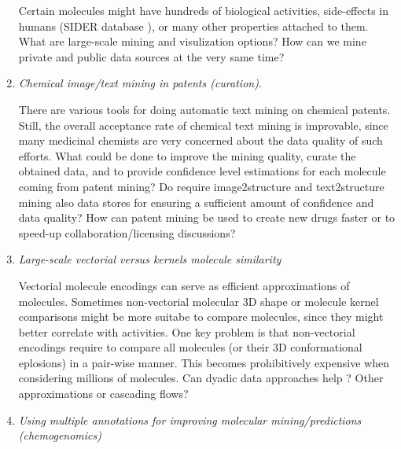 \documentclass{sig-alternate}
\begin{document}
\begin{enumerate}
  Certain molecules might have hundreds of biological activities,
  side-effects in humans (SIDER database
  \cite{Kuhn_Campillos_Letunic_Jensen_Bork_2010}), or many other
  properties attached to them. What are large-scale mining and
  visulization options?  How can we mine private and public data
  sources at the very same time?
%
\item \emph{Chemical image/text mining in patents (curation)}.

  There are various tools for doing automatic text mining on chemical
  patents. Still, the overall acceptance rate of chemical text mining
  is improvable, since many medicinal chemists are very concerned
  about the data quality of such efforts.  What could be done to
  improve the mining quality, curate the obtained data, and to provide
  confidence level estimations for each molecule coming from patent
  mining? Do require image2structure and text2structure mining also
  data stores for ensuring a sufficient amount of confidence and data
  quality?  How can patent mining be used to create new drugs faster
  or to speed-up collaboration/licensing discussions?

\item \emph{Large-scale vectorial versus kernels molecule similarity}

  Vectorial molecule encodings can serve as efficient approximations
  of molecules.  Sometimes non-vectorial molecular 3D shape or
  molecule kernel comparisons might be more suitabe to compare
  molecules, since they might better correlate with activities. One
  key problem is that non-vectorial encodings require to compare all
  molecules (or their 3D conformational eplosions) in a pair-wise
  manner.  This becomes prohibitively expensive when considering
  millions of molecules.  Can dyadic data approaches help
  \cite{Hochreiter:2006:SVM:1159508.1159516}? Other approximations or
  cascading flows?
%
\item \emph{Using multiple annotations for improving molecular mining/predictions (chemogenomics)}


\end{enumerate}
\end{document}
